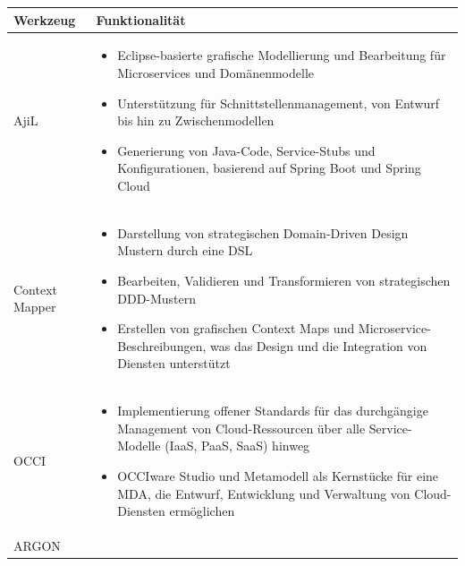 {\begin{table}[h]
\centering
\renewcommand{\arraystretch}{1.5}
\begin{tabularx}{\textwidth}{p{}X}
\hline
Werkzeug & Funktionalität \\
\hline
AjiL \cite{rademacher} & 
\begin{itemize}[leftmargin=*, nosep, before=\vspace{-0.6\baselineskip}, after=\vspace{-\baselineskip}]
	\item Eclipse-basierte grafische Modellierung und Bearbeitung für Microservices und Domänenmodelle
	\item Unterstützung für Schnittstellenmanagement, von Entwurf bis hin zu Zwischenmodellen
	\item Generierung von Java-Code, Service-Stubs und Konfigurationen, basierend auf Spring Boot und Spring Cloud
\end{itemize} \\
\hline
Context Mapper \cite{mapper} & 
\begin{itemize}[leftmargin=*, nosep, before=\vspace{-0.6\baselineskip}, after=\vspace{-\baselineskip}]
    \item Darstellung von strategischen Domain-Driven Design Mustern durch eine DSL
    \item Bearbeiten, Validieren und Transformieren von strategischen DDD-Mustern
    \item Erstellen von grafischen Context Maps und Microservice-Beschreibungen, was das Design und die Integration von Diensten unterstützt
\end{itemize} \\
\hline
OCCI \cite{zalila} & 
\begin{itemize}[leftmargin=*, nosep, before=\vspace{-0.6\baselineskip}, after=\vspace{-\baselineskip}]
	\item Implementierung offener Standards für das durchgängige Management von Cloud-Ressourcen über alle Service-Modelle (IaaS, PaaS, SaaS) hinweg
	\item OCCIware Studio und Metamodell als Kernstücke für eine MDA, die Entwurf, Entwicklung und Verwaltung von Cloud-Diensten ermöglichen
\end{itemize} \\
\hline
ARGON \cite{argon} & 
\begin{itemize}[leftmargin=*, nosep, before=\vspace{-0.6\baselineskip}, after=\vspace{-\baselineskip}]

\end{itemize}
\end{tabularx}
\end{table}}
